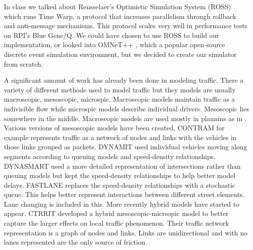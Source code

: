 \documentclass[10pt,a4paper]{article}
\begin{document}
    In class we talked about Rensselaer’s Optimistic Simulation System (ROSS) \cite{Barnes:2013:WSE:2486092.2486134} which runs Time Warp, a protocol that increases parallelism through rollback and anti-message mechanisms. This protocol scales very well in performance tests on RPI's Blue Gene/Q. We could have chosen to use ROSS to build our implementation, or looked into OMNeT++ \cite{Varga:2008:OOS:1416222.1416290}, which a popular open-source discrete event simulation environment, but we decided to create our simulator from scratch. 
    
    A significant amount of work has already been done in modeling traffic. There a variety of different methods used to model traffic but they models are usually macroscopic, mesoscopic, microspic. Macroscopic models maintain traffic as a indivisible flow while microspic models describe individual drivers. Mesoscopic lies somewhere in the middle. Macroscopic models are used mostly in plannins as in \cite{Salem:1994}. Various versions of mesoscopic models have been created, CONTRAM \cite{CONTRAM:1989} for example represents traffic as a network of nodes and links with the vehicles in those links grouped as packets. DYNAMIT \cite{Ben-AKiva:2001} used individual vehicles moving along segments according to queuing models and speed-density relationships. DYNASMART \cite{Jayakrishnan:1994} used a more detailed representation of intersections rather than queuing models but kept the speed-density relationships to help better model delays. FASTLANE \cite{Gawron:1998} replaces the speed-density relationships with a stochastic queue. This helps better represent interactions between different street elements. Lane changing is included in this. More recently hybrid models \cite{Burghout:2005} have started to appear. CTRRIT \cite{Burghout:2006} developed a hybrid mesoscopic-micrsopic model to better capture the larger effects on local traffic phenomenon. Their traffic network representation is a graph of nodes and links. Links are unidirectional and with no lanes represented are the only source of friction.
    
\end{document}
